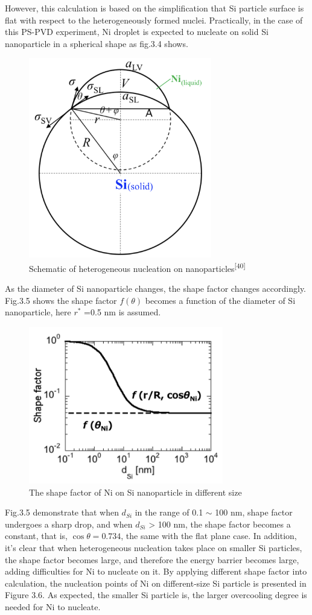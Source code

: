However, this calculation is based on the simplification that Si particle surface is flat with respect to the heterogeneously formed nuclei. Practically, in the case of this PS-PVD experiment, Ni droplet is  expected to nucleate on solid Si nanoparticle in a spherical shape as fig.3.4 shows. 
\begin{figure}[H]
\centering
\includegraphics[width=8cm]{src/fig/fig33.png}
\caption{Schematic of heterogeneous nucleation on nanoparticles\textsuperscript{[40]}}
\end{figure}
As the diameter of Si nanoparticle changes, the shape factor changes accordingly. Fig.3.5 shows the shape factor $f(\theta)$ becomes a function of the diameter of Si nanoparticle, here $r^{*}$ =0.5 nm is assumed.
\begin{figure}[H]
\centering
\includegraphics[width=8.5cm]{src/fig/fig34.png}
\caption{The shape factor of Ni on Si nanoparticle in different size}
\end{figure}
Fig.3.5 demonstrate that when $d_{Si}$ in the range of 0.1 $\sim$ 100 nm, shape factor undergoes a sharp drop, and when $d_{Si}$ > 100 nm, the shape factor becomes a constant, that is, $\cos \theta=0.734$, the same with the flat plane case. In addition, it's clear that  when heterogeneous nucleation takes place on smaller Si particles, the shape factor becomes large, and therefore the energy barrier becomes large, adding difficulties for Ni to nucleate on it. By applying different shape factor into calculation, the nucleation points of Ni on different-size Si particle is presented in Figure 3.6. As expected, the smaller Si particle is, the larger overcooling degree is needed for Ni to nucleate.

